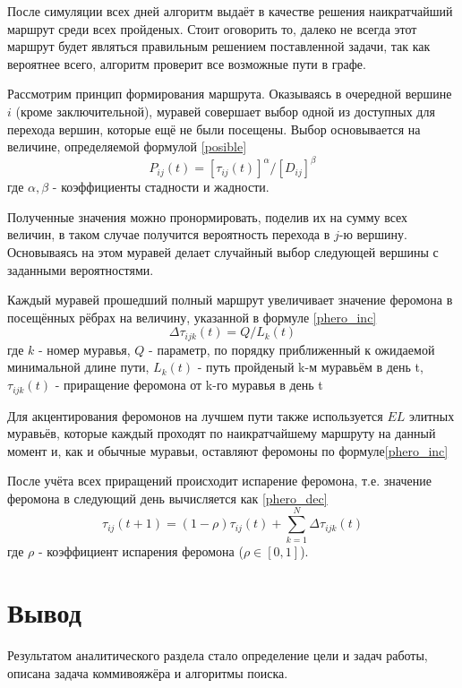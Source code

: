 После симуляции всех дней алгоритм выдаёт в качестве решения наикратчайший маршрут среди всех пройденых. Стоит оговорить то, далеко не всегда этот маршрут будет являться правильным решением поставленной задачи, так как вероятнее всего, алгоритм проверит все возможные пути в графе.

Рассмотрим принцип формирования маршрута. Оказываясь в очередной вершине $i$ (кроме заключительной), муравей совершает выбор одной из доступных для перехода вершин, которые ещё не были посещены. Выбор основывается на величине, определяемой формулой \ref{posible}
\begin{equation}\label{posible}
	P_{ij}(t) = [\tau_{ij}(t)]^{\alpha} / [D_{ij}]^{\beta}
\end{equation} где
	$\alpha, \beta$ - коэффициенты стадности и жадности.

Полученные значения можно пронормировать, поделив их на сумму всех величин, в таком случае получится вероятность перехода в $j$-ю вершину. Основываясь на этом муравей делает случайный выбор следующей вершины с заданными вероятностями.

Каждый муравей прошедший полный маршрут увеличивает значение феромона в посещённых рёбрах на величину, указанной в формуле \ref{phero_inc}
\begin{equation}\label{phero_inc}
	\Delta\tau_{ijk}(t) = Q / L_{k}(t)
\end{equation} где
	$k$ - номер муравья,
	$Q$ - параметр, по порядку приближенный к ожидаемой минимальной длине пути,
	$L_{k}(t)$ - путь пройденый k-м муравьём в день t,
	$\tau_{ijk}(t)$ - приращение феромона от k-го муравья в день t
	
Для акцентирования феромонов на лучшем пути также используется $EL$ элитных муравьёв, которые каждый проходят по наикратчайшему маршруту на данный момент и, как и обычные муравьи, оставляют феромоны по формуле\ref{phero_inc}

После учёта всех приращений происходит испарение феромона, т.е. значение феромона в следующий день вычисляется как \ref{phero_dec}
\begin{equation}\label{phero_dec}
	\tau_{ij}(t+1) = (1-\rho)\tau_{ij}(t) + \sum\limits_{k=1}^{N} \Delta\tau_{ijk}(t)
\end{equation} где
	$\rho$ - коэффициент испарения феромона ($\rho \in [0,1]$).


\section*{Вывод}
Результатом аналитического раздела стало определение цели и задач работы, описана задача коммивояжёра и алгоритмы поиска.